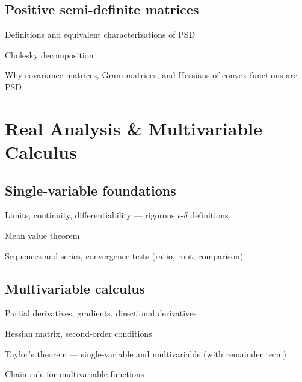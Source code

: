 \subsection{Positive semi-definite matrices}
\begin{tasklist}
    \item Definitions and equivalent characterizations of PSD
    \item Cholesky decomposition
    \item Why covariance matrices, Gram matrices, and Hessians of convex functions are PSD
\end{tasklist}

\section{Real Analysis \& Multivariable Calculus}

\subsection{Single-variable foundations}
\begin{tasklist}
    \item Limits, continuity, differentiability — rigorous $\epsilon$-$\delta$ definitions
    \item Mean value theorem
    \item Sequences and series, convergence tests (ratio, root, comparison)
\end{tasklist}

\subsection{Multivariable calculus}
\begin{tasklist}
    \item Partial derivatives, gradients, directional derivatives
    \item Hessian matrix, second-order conditions
    \item Taylor's theorem — single-variable and multivariable (with remainder term)
    \item Chain rule for multivariable functions
\end{tasklist}


